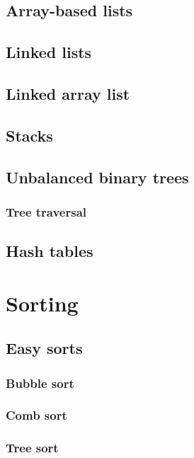 \documentclass[oneside]{book}
\begin{document}
\section{Array-based lists}

\section{Linked lists}

\section{Linked array list}

\section{Stacks}

\section{Unbalanced binary trees}

\subsection{Tree traversal}

\section{Hash tables}

\chapter{Sorting}

\section{Easy sorts}

\subsection{Bubble sort}

\subsection{Comb sort}

\subsection{Tree sort}
\end{document}
